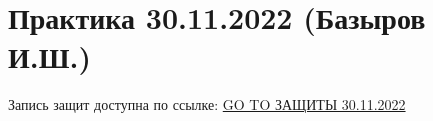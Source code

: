 \documentclass[main.tex]{subfiles}
\begin{document}

\section{Практика 30.11.2022 (Базыров И.Ш.)}

Запись защит доступна по ссылке: \href{https://disk.yandex.ru/d/HeQUisnwV0K5EQ/\%D0\%92\%D1\%82\%D0\%BE\%D1\%80\%D0\%BE\%D0\%B9\%20\%D0\%BA\%D1\%83\%D1\%80\%D1\%81\%20\%D0\%BC\%D0\%B0\%D0\%B3\%D0\%B8\%D1\%81\%D1\%82\%D1\%80\%D0\%B0\%D1\%82\%D1\%83\%D1\%80\%D1\%8B/\%D0\%93\%D0\%B8\%D0\%B4\%D1\%80\%D0\%BE\%D0\%B4\%D0\%B8\%D0\%BD\%D0\%B0\%D0\%BC\%D0\%B8\%D1\%87\%D0\%B5\%D1\%81\%D0\%BA\%D0\%BE\%D0\%B5\%20\%D0\%BC\%D0\%BE\%D0\%B4\%D0\%B5\%D0\%BB\%D0\%B8\%D1\%80\%D0\%BE\%D0\%B2\%D0\%B0\%D0\%BD\%D0\%B8\%D0\%B5/2022_11_30_\%D0\%93\%D0\%94\%D0\%9C_\%D0\%B7\%D0\%B0\%D1\%89\%D0\%B8\%D1\%82\%D1\%8B6.mp4}{GO TO ЗАЩИТЫ 30.11.2022}
\end{document}

